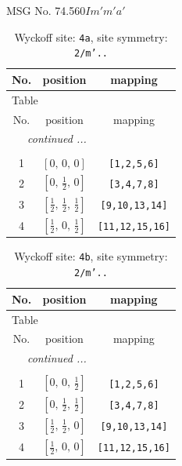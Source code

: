 \documentclass[fleqn,8pt]{jsarticle}
\begin{document}
\setcounter{MaxMatrixCols}{32}

\renewcommand{\tablename}{Table~}
\renewcommand{\figurename}{Figure~}
\begin{center}
\LARGE
MSG No. 74.560\quad$Im'm'a'$
\end{center}
\renewcommand{\arraystretch}{1.2}
\begin{longtable}{ccc}
\caption{Wyckoff site: {\tt 4a}, site symmetry: {\tt 2/m'..}}
 \\
 \hline \hline
No. & position & mapping \\ \hline \endfirsthead

\multicolumn{2}{l}{\tablename\ \thetable{}} \\
 \hline \hline
No. & position & mapping \\ \hline \endhead

 \hline \hline
\multicolumn{2}{r}{\footnotesize\it continued ...} \\ \endfoot

 \hline \hline
\multicolumn{2}{r}{} \\ \endlastfoot

1 & $\left[ 0,\, 0,\, 0 \right]$ & {\tt [1,2,5,6]} \\ \hline
2 & $\left[ 0,\, \frac{1}{2},\, 0 \right]$ & {\tt [3,4,7,8]} \\ \hline
3 & $\left[ \frac{1}{2},\, \frac{1}{2},\, \frac{1}{2} \right]$ & {\tt [9,10,13,14]} \\ \hline
4 & $\left[ \frac{1}{2},\, 0,\, \frac{1}{2} \right]$ & {\tt [11,12,15,16]} \\
\end{longtable}
\renewcommand{\arraystretch}{1.2}
\begin{longtable}{ccc}
\caption{Wyckoff site: {\tt 4b}, site symmetry: {\tt 2/m'..}}
 \\
 \hline \hline
No. & position & mapping \\ \hline \endfirsthead

\multicolumn{2}{l}{\tablename\ \thetable{}} \\
 \hline \hline
No. & position & mapping \\ \hline \endhead

 \hline \hline
\multicolumn{2}{r}{\footnotesize\it continued ...} \\ \endfoot

 \hline \hline
\multicolumn{2}{r}{} \\ \endlastfoot

1 & $\left[ 0,\, 0,\, \frac{1}{2} \right]$ & {\tt [1,2,5,6]} \\ \hline
2 & $\left[ 0,\, \frac{1}{2},\, \frac{1}{2} \right]$ & {\tt [3,4,7,8]} \\ \hline
3 & $\left[ \frac{1}{2},\, \frac{1}{2},\, 0 \right]$ & {\tt [9,10,13,14]} \\ \hline
4 & $\left[ \frac{1}{2},\, 0,\, 0 \right]$ & {\tt [11,12,15,16]} \\
\end{longtable}
\end{document}
